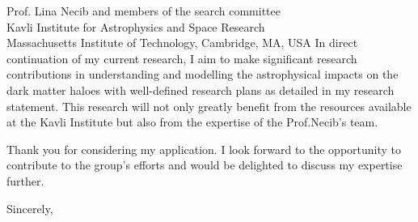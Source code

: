 \documentclass[11pt]{letter}
\begin{document}
\begin{letter}{Prof. Lina Necib and members of the search committee \\ Kavli Institute for Astrophysics and Space Research \\ Massachusetts Institute of Technology, Cambridge, MA, USA}
In direct continuation of my current research, I aim to make significant research contributions in understanding and modelling the astrophysical impacts on the dark matter haloes with well-defined research plans as detailed in my research statement. This research will not only greatly benefit from the resources available at the Kavli Institute but also from the expertise of the Prof.Necib's team.

Thank you for considering my application. I look forward to the opportunity to contribute to the group's efforts and would be delighted to discuss my expertise further.

\closing{Sincerely,}

\end{letter}
\end{document}
